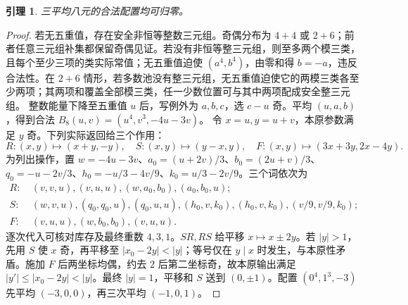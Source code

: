 \documentclass[11pt,a4paper]{article}
\newtheorem{lemma}[theorem]{引理}
\theoremstyle{definition}
\numberwithin{equation}{section}
\begin{document}
\begin{lemma}\label{lem:eight}
三平均八元的合法配置均可归零。
\end{lemma}
\begin{proof}
若无五重值，存在安全非恒等整数三元组。奇偶分布为 $4+4$ 或 $2+6$；前者任意三元组补集都保留奇偶见证。若没有非恒等整三元组，则至多两个模三类，且每个至少三项的类实际常值；无五重值迫使 $(a^4,b^4)$，由零和得 $b=-a$，违反合法性。在 $2+6$ 情形，若多数池没有整三元组，无五重值迫使它的两模三类各至少两项；其两项和覆盖全部模三类，任一少数位置可与其中两项配成安全整三元组。
整数能量下降至五重值 $u$ 后，写例外为 $a,b,c$，选 $c-u$ 奇。平均 $(u,a,b)$，得到合法 $B_8(u,v)=(u^4,v^3,-4u-3v)$。
令 $x=u,y=u+v$，本原参数满足 $y$ 奇。下列实际返回给三个作用：
\[
R:(x,y)\mapsto(x+y,-y),\quad
S:(x,y)\mapsto(y-x,y),\quad
F:(x,y)\mapsto(3x+3y,2x-4y).
\]
为列出操作，置 $w=-4u-3v$、$a_0=(u+2v)/3$、$b_0=(2u+v)/3$、$q_0=-u-2v/3$、$h_0=-u/3-4v/9$、$k_0=u/3-2v/9$。三个词依次为
\begin{align*}
R:&\ (v,v,u),(v,u,u),(w,a_0,b_0),(a_0,b_0,u);\\
S:&\ (w,v,u),(q_0,q_0,u),(q_0,u,u),
(h_0,v,k_0),(h_0,v,k_0),(v/9,v/9,k_0);\\
F:&\ (v,u,u),(w,b_0,b_0),(v,u,u).
\end{align*}
逐次代入可核对库存及最终重数 $4,3,1$。$SR,RS$ 给平移 $x\mapsto x\pm2y$。若 $|y|>1$，先用 $S$ 使 $x$ 奇，再平移至 $|x_0-2y|<|y|$；等号仅在 $y\mid x$ 时发生，与本原性矛盾。施加 $F$ 后两坐标均偶，约去 $2$ 后第二坐标奇，故本原输出满足 $|y'|\le|x_0-2y|<|y|$。最终 $|y|=1$，平移和 $S$ 送到 $(0,\pm1)$。配置 $(0^4,1^3,-3)$ 先平均 $(-3,0,0)$，再三次平均 $(-1,0,1)$。
\end{proof}
\end{document}
